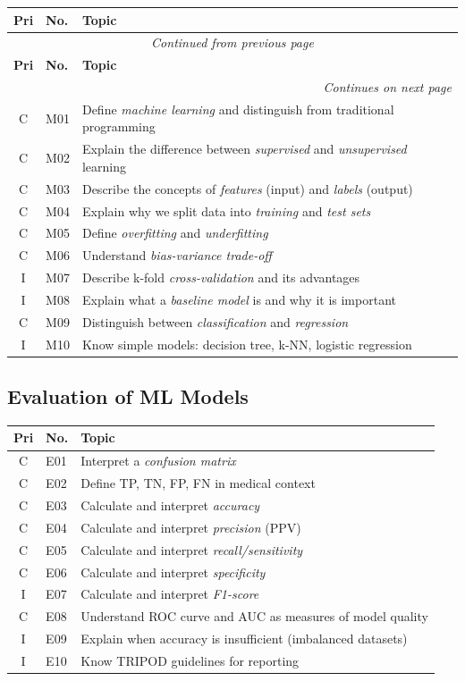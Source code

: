 \documentclass[11pt,a4paper]{article}
\begin{document}
\begin{longtable}{@{}clp{9cm}@{}}
\toprule
\textbf{Pri} & \textbf{No.} & \textbf{Topic} \\
\midrule
\endfirsthead
\multicolumn{3}{c}{\textit{Continued from previous page}} \\
\toprule
\textbf{Pri} & \textbf{No.} & \textbf{Topic} \\
\midrule
\endhead
\midrule
\multicolumn{3}{r}{\textit{Continues on next page}} \\
\endfoot
\bottomrule
\endlastfoot
C & M01 & Define \emph{machine learning} and distinguish from traditional programming \\
C & M02 & Explain the difference between \emph{supervised} and \emph{unsupervised} learning \\
C & M03 & Describe the concepts of \emph{features} (input) and \emph{labels} (output) \\
C & M04 & Explain why we split data into \emph{training} and \emph{test sets} \\
C & M05 & Define \emph{overfitting} and \emph{underfitting} \\
C & M06 & Understand \emph{bias-variance trade-off} \\
I & M07 & Describe k-fold \emph{cross-validation} and its advantages \\
I & M08 & Explain what a \emph{baseline model} is and why it is important \\
C & M09 & Distinguish between \emph{classification} and \emph{regression} \\
I & M10 & Know simple models: decision tree, k-NN, logistic regression \\
\end{longtable}

\subsection{Evaluation of ML Models}

\begin{longtable}{@{}clp{9cm}@{}}
\toprule
\textbf{Pri} & \textbf{No.} & \textbf{Topic} \\
\midrule
\endfirsthead
\midrule
\endhead
\midrule
\endfoot
\bottomrule
\endlastfoot
C & E01 & Interpret a \emph{confusion matrix} \\
C & E02 & Define TP, TN, FP, FN in medical context \\
C & E03 & Calculate and interpret \emph{accuracy} \\
C & E04 & Calculate and interpret \emph{precision} (PPV) \\
C & E05 & Calculate and interpret \emph{recall/sensitivity} \\
C & E06 & Calculate and interpret \emph{specificity} \\
I & E07 & Calculate and interpret \emph{F1-score} \\
C & E08 & Understand ROC curve and AUC as measures of model quality \\
I & E09 & Explain when accuracy is insufficient (imbalanced datasets) \\
I & E10 & Know TRIPOD guidelines for reporting \\
\end{longtable}
\end{document}
